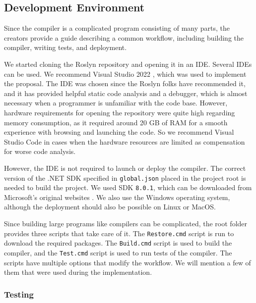 \subsection{Development Environment}

Since the compiler is a complicated program consisting of many parts, the creators provide a guide \cite{online:roslynGuide} describing a common workflow, including building the compiler, writing tests, and deployment.
\par
We started cloning the Roslyn repository \cite{online:roslynRepo} and opening it in an IDE.
Several IDEs can be used. We recommend Visual Studio 2022 \cite{online:vs}, which was used to implement the proposal. 
The IDE was chosen since the Roslyn folks have recommended it, and it has provided helpful static code analysis and a debugger, which is almost necessary when a programmer is unfamiliar with the code base. 
However, hardware requirements for opening the repository were quite high regarding memory consumption, as it required around 20 GB of RAM for a smooth experience with browsing and launching the code. 
So we recommend Visual Studio Code \cite{online:vsCode} in cases when the hardware resources are
limited as compensation for worse code analysis.
\par
However, the IDE is not required to launch or deploy the compiler.
The correct version of the .NET SDK specified in \texttt{global.json} placed in the project root is needed to build the project. 
We used SDK \texttt{8.0.1}, which can be downloaded from Microsoft's original websites \cite{online:sdk}. 
We also use the Windows operating system, although the deployment should also be possible on Linux or MacOS.
\par
Since building large programs like compilers can be complicated, the root folder provides three scripts that take care of it. 
The \texttt{Restore.cmd} script is run to download the required packages. 
The \texttt{Build.cmd} script is used to build the compiler, and the \texttt{Test.cmd} script is used to run tests of the compiler. 
The scripts have multiple options that modify the workflow. We will mention a few of them that were used during the implementation.

\subsubsection{Testing}

